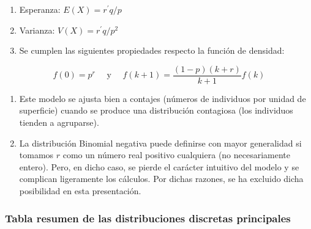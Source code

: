 \documentclass[
]{article}
\begin{document}
\begin{enumerate}
\def\labelenumi{\arabic{enumi}.}
\item
  Esperanza: \(E(X)=r^{\prime} q / p\)
\item
  Varianza: \(V(X)=r^{\prime} q / p^{2}\)
\item
  Se cumplen las siguientes propiedades respecto la función de densidad:
\end{enumerate}

\[
f(0)=p^{r} \quad \text { y } \quad f(k+1)=\frac{(1-p)(k+r)}{k+1} f(k)
\]

\begin{enumerate}
\def\labelenumi{\arabic{enumi}.}
\setcounter{enumi}{3}
\item
  Este modelo se ajusta bien a contajes (números de individuos por unidad de superficie) cuando se produce una distribución contagiosa (los individuos tienden a agruparse).
\item
  La distribución Binomial negativa puede definirse con mayor generalidad si tomamos \(r\) como un número real positivo cualquiera (no necesariamente entero). Pero, en dicho caso, se pierde el carácter intuitivo del modelo y se complican ligeramente los cálculos. Por dichas razones, se ha excluido dicha posibilidad en esta presentación.
\end{enumerate}

\subsubsection{Tabla resumen de las distribuciones discretas principales}\label{tabla-resumen-de-las-distribuciones-discretas-principales}
\end{document}
